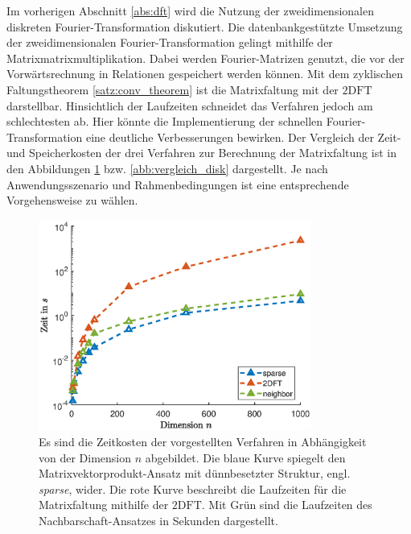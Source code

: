 Im vorherigen Abschnitt \ref{abs:dft} wird die Nutzung der zweidimensionalen diskreten Fourier-Transformation diskutiert. Die datenbankgestützte Umsetzung der zweidimensionalen Fourier-Transformation gelingt mithilfe der Matrixmatrixmultiplikation. Dabei werden Fourier-Matrizen genutzt, die vor der Vorwärtsrechnung in Relationen gespeichert werden können. Mit dem zyklischen Faltungstheorem \ref{satz:conv_theorem} ist die Matrixfaltung mit der $\mathrm{2DFT}$ darstellbar. Hinsichtlich der Laufzeiten schneidet das Verfahren jedoch am schlechtesten ab. Hier könnte die Implementierung der schnellen Fourier-Transformation eine deutliche Verbesserungen bewirken. Der Vergleich der Zeit- und Speicherkosten der drei Verfahren zur Berechnung der Matrixfaltung ist in den Abbildungen \ref{abb:vergleich_t} bzw. \ref{abb:vergleich_disk} dargestellt. Je nach Anwendungsszenario und Rahmenbedingungen ist eine entsprechende Vorgehensweise zu wählen.

\begin{figure}[h]
    \includegraphics[width=0.8\textwidth]{pics/chapters/kap5/data_plot_vergleich_t.eps}
    \centering
    \caption[Vergleich der Zeitkosten für die Matrixfaltung]{Es sind die Zeitkosten der vorgestellten Verfahren in Abhängigkeit von der Dimension $n$ abgebildet. Die blaue Kurve spiegelt den Matrixvektorprodukt-Ansatz mit dünnbesetzter Struktur, engl. \textit{sparse}, wider. Die rote Kurve beschreibt die Laufzeiten für die Matrixfaltung mithilfe der $\mathrm{2DFT}$. Mit Grün sind die Laufzeiten des Nachbarschaft-Ansatzes in Sekunden dargestellt.}
    \label{abb:vergleich_t}
\end{figure}

